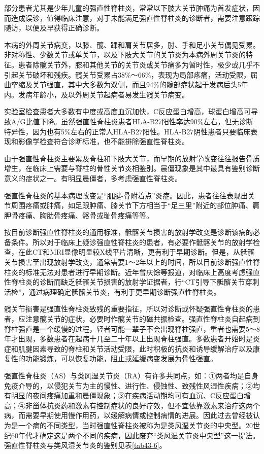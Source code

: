 部分患者尤其是少年儿童的强直性脊柱炎，常常以下肢大关节肿痛为首发症状，因而造成误诊，值得临床注意，对于未能满足强直性脊柱炎的诊断者，需要注意跟踪随访，以便及早获得正确诊断。

本病的外周关节病变，以膝、髋、踝和肩关节居多，肘、手和足小关节偶见受累。非对称性、少数关节或单关节，以及下肢大关节的关节炎为本病外周关节炎的特征。患者除髋关节外，膝和其他关节的关节炎或关节痛多为暂时性，极少或几乎不引起关节破坏和残疾。髋关节受累占38\%～66\%，表现为局部疼痛，活动受限，屈曲挛缩及关节强直，其中大多数为双侧，而且94\%的髋部症状起于发病后头5年内。发病年龄小，及以外周关节起病者易发生髋关节病变。

实验室检查患者大多数有中度或高度血沉加快，C反应蛋白增高，球蛋白增高可导致A/G比值下降。虽然强直性脊柱炎患者HLA-B27阳性率达90\%左右，但无诊断特异性，因为也有5\%左右的正常人HLA-B27阳性。HLA-B27阴性患者只要临床表现和影像学检查符合诊断标准，也不能排除强直性脊柱炎。

由于强直性脊柱炎主要累及脊柱和下肢大关节，而早期的放射学改变往往报告骨质增生，在临床上需要与脊柱的骨性关节炎相鉴别。晨僵现象是其中最具有鉴别诊断意义的症状之一。有明显晨僵者，多考虑强直性脊柱炎。

强直性脊柱炎的基本病理改变是“肌腱-骨附着点”炎症。因此，患者往往表现出关节周围疼痛或肿痛，如足跟肿痛、膝关节下方相当于“足三里”附近的部位肿痛、肩胛骨疼痛、胸肋骨疼痛、髂骨或耻骨疼痛等等。

按目前诊断强直性脊柱炎的通用标准，骶髂关节损害的放射学改变是诊断该病的必备条件。所以对于临床上疑诊强直性脊柱炎的患者，有必要作骶髂关节的放射学检查，在此CT和MRI显像明显较X线平片清晰，更有利于早期诊断。但是，从骶髂关节损害至出现放射学改变，通常需要1～2年以上的时间，所以目前诊断强直性脊柱炎的标准无法对患者进行早期诊断。近年曾庆馀等报道，对临床上高度考虑强直性脊柱炎的诊断而缺乏骶髂关节损害的放射学证据者，行“CT引导下骶髂关节穿刺活检”，通过病理确定骶髂关节炎，有利于更早期诊断强直性脊柱炎。

髋关节损害是强直性脊柱炎致残的重要指征，所以对诊断或怀疑强直性脊柱炎的患者，应注意髋关节的症状，必要时作髋关节的磁共振检查。强直性脊柱炎自起病到脊柱强直是一个缓慢的过程，轻者可能一辈子不会出现脊柱强直，重者也需要5～8年才出现，多数患者在起病十几至二十年以上出现脊柱强直。多数患者开始时是炎症和肌腱因素导致的脊柱和关节活动受限，此时积极的抗炎和诱导缓解治疗以及康复性的功能锻炼，可以恢复功能，阻止或延缓病变发展为骨性强直。

强直性脊柱炎（AS）与类风湿关节炎（RA）有许多共同点，如：①两者均是自身免疫介导的，以侵犯关节为主的慢性、进行性、侵蚀性、致残性风湿性疾病；②均有明显的夜间疼痛加重和晨僵现象；③在疾病活动期均可有血沉、C反应蛋白增高；④非甾体抗炎药和激素有控制症状的良好疗效，但不宜依靠激素来治疗这两个病，而需要早期使用慢作用药，以缓解病情或控制病情的进展。因此过去曾经被认为是一个病的不同类型，当时强直性脊柱炎被称为是类风湿关节炎的中央型。20世纪60年代才确定这是两个不同的疾病，因此废弃“类风湿关节炎中央型”这一提法。强直性脊柱炎与类风湿关节炎的鉴别见表\ref{tab43-6}。

